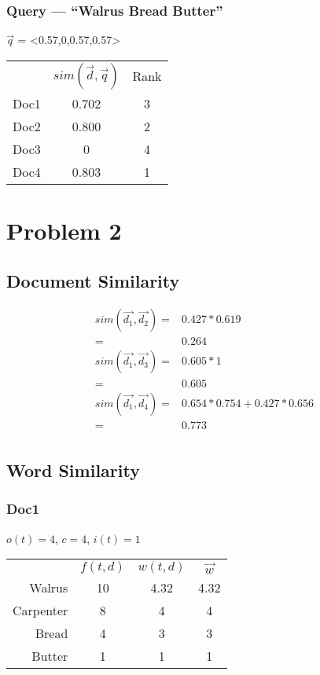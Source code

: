 \documentclass{article}
\begin{document}
\subsubsection{Query --- ``Walrus Bread Butter''}
$\vec{q}$ = <0.57,0,0.57,0.57>
\begin{tabular}{r c c}
\multicolumn{1}{r}{}
 & \multicolumn{1}{c}{$sim(\vec{d},\vec{q})$}
 & \multicolumn{1}{c}{Rank} \\
\cline{2-3}
Doc1 & 0.702 & 3 \\
\cline{2-3}
Doc2 & 0.800 & 2 \\
\cline{2-3}
Doc3 & 0 & 4 \\
\cline{2-3}
Doc4 & 0.803 & 1 \\
\cline{2-3}
\end{tabular}

\section[B]{Problem 2}
\subsection{Document Similarity}
\begin{align*}
  sim(\vec{d_1},\vec{d_2}) =& 0.427*0.619 \\
  =& 0.264 \\
  sim(\vec{d_1},\vec{d_3}) =& 0.605 * 1\\
  =& 0.605 \\
  sim(\vec{d_1},\vec{d_4}) =& 0.654*0.754 + 0.427*0.656 \\
  =& 0.773 \\
\end{align*}

\subsection{Word Similarity}
\subsubsection*{Doc1}
$o(t) = 4$, $c = 4$, $i(t) = 1$

\begin{tabular}{r c c c}
\multicolumn{1}{r}{}
 & \multicolumn{1}{c}{$f(t,d)$}
 & \multicolumn{1}{c}{$w(t,d)$}
 & \multicolumn{1}{c}{$\vec{w}$} \\
\cline{2-4}
Walrus & 10 & 4.32 & 4.32 \\
\cline{2-4}
Carpenter & 8 & 4 & 4 \\
\cline{2-4}
Bread & 4 & 3 & 3 \\
\cline{2-4}
Butter & 1 & 1 & 1 \\
\cline{2-4}
\end{tabular} \\
\end{document}
